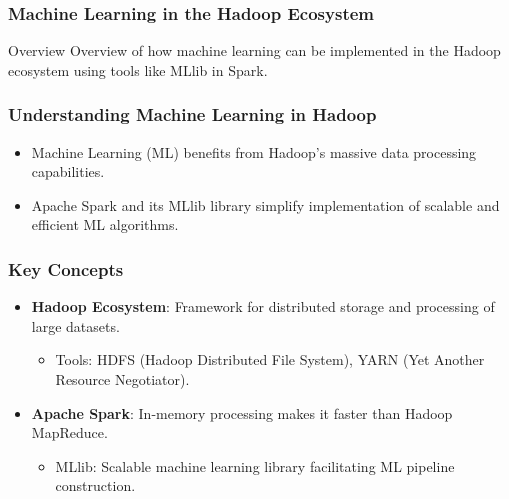 \documentclass[aspectratio=169]{beamer}
\begin{document}
\begin{frame}[fragile]
    \frametitle{Machine Learning in the Hadoop Ecosystem}
    \begin{block}{Overview}
        Overview of how machine learning can be implemented in the Hadoop ecosystem using tools like MLlib in Spark.
    \end{block}
\end{frame}

\begin{frame}[fragile]
    \frametitle{Understanding Machine Learning in Hadoop}
    \begin{itemize}
        \item Machine Learning (ML) benefits from Hadoop's massive data processing capabilities.
        \item Apache Spark and its MLlib library simplify implementation of scalable and efficient ML algorithms.
    \end{itemize}
\end{frame}

\begin{frame}[fragile]
    \frametitle{Key Concepts}
    \begin{itemize}
        \item \textbf{Hadoop Ecosystem}: Framework for distributed storage and processing of large datasets.
            \begin{itemize}
                \item Tools: HDFS (Hadoop Distributed File System), YARN (Yet Another Resource Negotiator).
            \end{itemize}
        \item \textbf{Apache Spark}: In-memory processing makes it faster than Hadoop MapReduce. 
            \begin{itemize}
                \item MLlib: Scalable machine learning library facilitating ML pipeline construction.
            \end{itemize}
    \end{itemize}
\end{frame}
\end{document}
